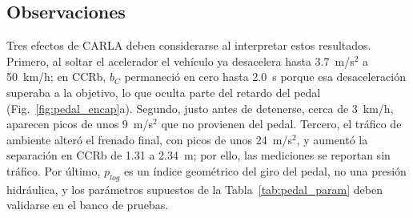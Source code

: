 \subsection{Observaciones}

Tres efectos de CARLA deben considerarse al interpretar estos resultados.
Primero, al soltar el acelerador el vehículo ya desacelera hasta
3.7~m/s$^2$ a 50~km/h; en CCRb, $b_C$ permaneció en cero hasta 2.0~s porque
esa desaceleración superaba a la objetivo, lo que oculta parte del retardo del
pedal (Fig.~\ref{fig:pedal_encap}a). Segundo, justo antes de detenerse, cerca
de 3~km/h, aparecen picos de unos 9~m/s$^2$ que no provienen del pedal.
Tercero, el tráfico de ambiente alteró el frenado final, con picos de unos
24~m/s$^2$, y aumentó la separación en CCRb de 1.31 a 2.34~m; por ello, las
mediciones se reportan sin tráfico. Por último, $p_{log}$ es un índice
geométrico del giro del pedal, no una presión hidráulica, y los parámetros
supuestos de la Tabla~\ref{tab:pedal_param} deben validarse en el banco de
pruebas.
\endgroup
